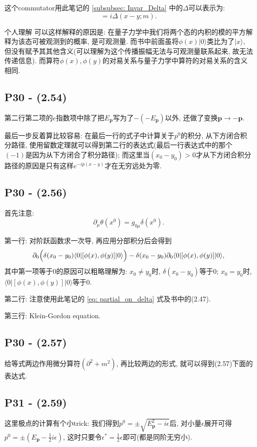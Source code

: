 这个commutator用此笔记的 \ref{subsubsec: Invar_Delta} 中的$\Delta$可以表示为:
\begin{equation}
  [\phi(x), \phi(y)] = i\Delta(x-y; m).
\end{equation}

\begin{mybox}{个人理解}
  可以这样解释的原因是: 在量子力学中我们将两个态的内积的模的平方解释为该态可被观测到的概率, 是可观测量.
  而书中前面虽将$\phi(x) |0\rangle$类比为了$|x\rangle$, 但没有赋予其其他含义(可以理解为这个传播振幅无法与可观测量联系起来, 故无法传递信息).
  而算符$\phi(x), \phi(y)$的对易关系与量子力学中算符的对易关系的含义相同.
\end{mybox}

\subsection{P30 - (2.54)}

第二行第二项的$e$指数项中除了把$E_\mathbf{p}$写为了$-(-E_\mathbf{p})$以外, 还做了变换$\mathbf{p} \rightarrow -\mathbf{p}$.

最后一步反着算比较容易: 在最后一行的式子中计算关于$p^0$的积分, 从下方闭合积分路径, 使用留数定理就可以得到第二行的表达式(最后一行表达式中的那个$(-1)$是因为从下方闭合了积分路径); 而这里当$(x_0 - y_0)>0$才从下方闭合积分路径的原因是只有这样$e^{-ip(x - y)}$才在无穷远处为零.

\subsection{P30 - (2.56)}

首先注意:
\begin{equation}
  \partial_\mu \theta(x^0) = g_{0\mu} \delta(x^0) \label{eq: partial_on_delta}.
\end{equation}

第一行: 对阶跃函数求一次导, 再应用分部积分后会得到
\begin{equation}
  \partial_0 \Bigl(\delta(x_0 - y_0)\langle 0|[\phi(x), \phi(y)]|0\rangle \Bigr)-\delta(x_0 - y_0)\partial_0\langle 0|[\phi(x), \phi(y)]|0\rangle,
\end{equation}
其中第一项等于0的原因可以粗略理解为: $x_0 \neq y_0$时, $\delta(x_0 - y_0)$等于0; $x_0 = y_0$时, $\langle 0|[\phi(x), \phi(y)]|0\rangle$等于0.

第二行: 注意使用此笔记的 \eqref{eq: partial_on_delta} 式及书中的(2.47).

第三行: Klein-Gordon equation.

\subsection{P30 - (2.57)}

给等式两边作用微分算符$(\partial^2 + m^2)$, 再比较两边的形式, 就可以得到(2.57)下面的表达式.

\subsection{P31 - (2.59)}

这里极点的计算有个小trick: 我们得到$p^0 = \pm\sqrt{E_\mathbf{p}^2 - i\epsilon}$后, 对小量$\epsilon$展开可得$p^0 = \pm (E_\mathbf{p} - \frac{1}{2}i\epsilon)$, 这时只要令$\epsilon^* = \frac{1}{2}\epsilon$即可(都是同阶无穷小).
